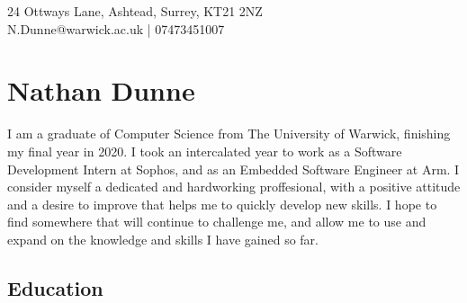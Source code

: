 \documentclass[11pt]{article}
\newcommand{\linesep}{\noindent\makebox[\linewidth]{\rule{\linewidth}{0.2pt}}}
\begin{document}
\hspace*{\fill} 24 Ottways Lane, Ashtead, Surrey, KT21 2NZ \\
\hspace*{\fill} N.Dunne@warwick.ac.uk | 07473451007
\section*{Nathan Dunne}

I am a graduate of Computer Science from The University of Warwick, finishing my final year in 2020. I took an intercalated year to work as a Software Development Intern at Sophos, and as an Embedded Software Engineer at Arm. I consider myself a dedicated and hardworking proffesional, with a positive attitude and a desire to improve that helps me to quickly develop new skills. I hope to find somewhere that will continue to challenge me, and allow me to use and expand on the knowledge and skills I have gained so far.

\linesep
\subsection*{Education}

\end{document}
